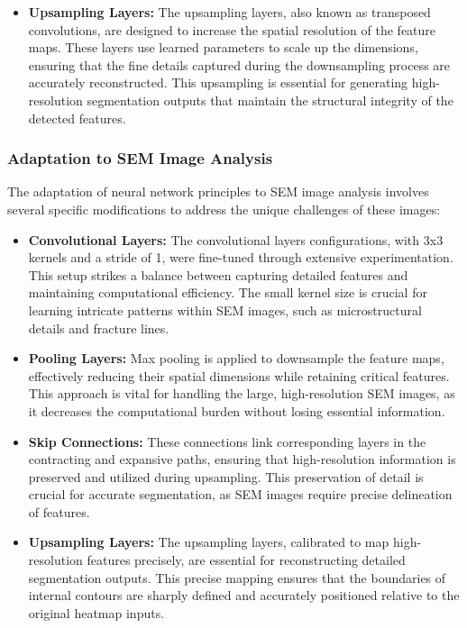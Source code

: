 \documentclass[preprint,12pt]{elsarticle}
\begin{document}
\begin{itemize}
\begin{itemize}
    \item \textbf{Upsampling Layers:} The upsampling layers, also known as transposed convolutions, are designed to increase the spatial resolution of the feature maps. These layers use learned parameters to scale up the dimensions, ensuring that the fine details captured during the downsampling process are accurately reconstructed. This upsampling is essential for generating high-resolution segmentation outputs that maintain the structural integrity of the detected features.
\end{itemize}

\subsubsection{Adaptation to SEM Image Analysis}
The adaptation of neural network principles to SEM image analysis involves several specific modifications to address the unique challenges of these images:

\begin{itemize}
    \item \textbf{Convolutional Layers:} The convolutional layers configurations, with 3x3 kernels and a stride of 1, were fine-tuned through extensive experimentation. This setup strikes a balance between capturing detailed features and maintaining computational efficiency. The small kernel size is crucial for learning intricate patterns within SEM images, such as microstructural details and fracture lines.

    \item \textbf{Pooling Layers:} Max pooling is applied to downsample the feature maps, effectively reducing their spatial dimensions while retaining critical features. This approach is vital for handling the large, high-resolution SEM images, as it decreases the computational burden without losing essential information.

    \item \textbf{Skip Connections:} These connections link corresponding layers in the contracting and expansive paths, ensuring that high-resolution information is preserved and utilized during upsampling. This preservation of detail is crucial for accurate segmentation, as SEM images require precise delineation of features.

    \item \textbf{Upsampling Layers:} The upsampling layers, calibrated to map high-resolution features precisely, are essential for reconstructing detailed segmentation outputs. This precise mapping ensures that the boundaries of internal contours are sharply defined and accurately positioned relative to the original heatmap inputs.
\end{itemize}


\end{itemize}
\end{document}
